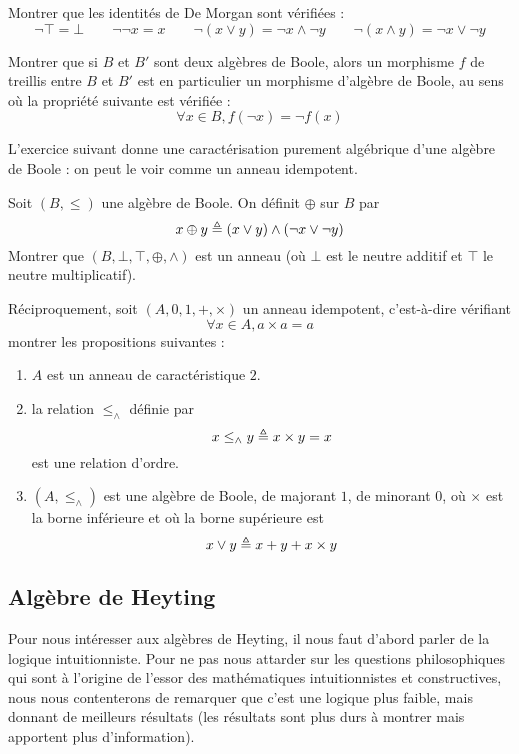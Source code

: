 \begin{exercise}
  Montrer que les identités de De Morgan sont vérifiées :
  \[\lnot \top = \bot \qquad \lnot\lnot x = x
  \qquad \lnot (x \lor y) = \lnot x \land \lnot y
  \qquad \lnot (x \land y) = \lnot x \lor \lnot y\]
\end{exercise}

\begin{exercise}
  Montrer que si $B$ et $B'$ sont deux algèbres de Boole, alors un morphisme $f$
  de treillis entre $B$ et $B'$ est en particulier un morphisme d'algèbre de
  Boole, au sens où la propriété suivante est vérifiée :
  \[\forall x \in B, f(\lnot x) = \lnot f(x)\]
\end{exercise}

L'exercice suivant donne une caractérisation purement algébrique d'une algèbre
de Boole : on peut le voir comme un anneau idempotent.

\begin{exercise}
  Soit $(B,\leq)$ une algèbre de Boole. On définit $\oplus$ sur $B$ par
  \[x\oplus y \triangleq (x\lor y) \land (\lnot x \lor \lnot y)\]
  Montrer que $(B,\bot,\top,\oplus,\land)$ est un anneau (où $\bot$ est le
  neutre additif et $\top$ le neutre multiplicatif).

  Réciproquement, soit $(A,0,1,+,\times)$ un anneau idempotent, c'est-à-dire
  vérifiant
  \[\forall x\in A, a\times a = a\]
  montrer les propositions suivantes :
  \begin{enumerate}[label=(\roman*)]
  \item $A$ est un anneau de caractéristique $2$.
  \item la relation $\leq_\land$ définie par
    \[x\leq_\land y \triangleq x\times y = x\]
    est une relation d'ordre.
  \item $(A,\leq_\land)$ est une algèbre de Boole, de majorant $1$, de minorant
    $0$, où $\times$ est la borne inférieure et où la borne supérieure est
    \[x\lor y \triangleq x + y + x \times y\]
  \end{enumerate}
\end{exercise}

\subsection{Algèbre de Heyting}

Pour nous intéresser aux algèbres de Heyting, il nous faut d'abord parler de la
logique intuitionniste. Pour ne pas nous attarder sur les questions
philosophiques qui sont à l'origine de l'essor des mathématiques intuitionnistes
et constructives, nous nous contenterons de remarquer que c'est une logique plus
faible, mais donnant de meilleurs résultats (les résultats sont plus durs à
montrer mais apportent plus d'information).

